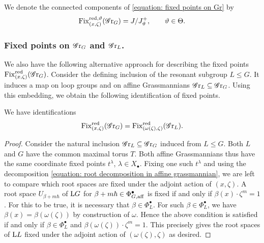 \begin{notation}
We denote the connected components of \eqref{equation: fixed points on Gr} by
\begin{equation*}
    \operatorname{Fix}^{\operatorname{red}, \vartheta}_{(x, \zeta)}(\operatorname{\mathscr{G}r}_G) = J/J^{+}_{\vartheta}, \qquad \vartheta \in \Theta.
\end{equation*}
\end{notation}




\subsubsection{Fixed points on $\operatorname{\mathscr{G}r}_G$ and $\operatorname{\mathscr{G}r}_L$.}\label{section: fixed points on GrG and GrL}
We also have the following alternative approach for describing the fixed points $\operatorname{Fix}^{\operatorname{red}}_{(x, \zeta)}(\operatorname{\mathscr{G}r}_G)$.
%
Consider the defining inclusion of the resonant subgroup $L \leq G$. It induces a map on loop groups and on affine Grassmannians $\operatorname{\mathscr{G}r}_L \subseteq \operatorname{\mathscr{G}r}_G$. Using this embedding, we obtain the following identification of fixed points.

\begin{lemma}\label{lemma: replacing x by the resonant part}
We have identifications
\begin{equation*}
    \operatorname{Fix}^{\operatorname{red}}_{(x, \zeta)}(\operatorname{\mathscr{G}r}_G) = \operatorname{Fix}^{\operatorname{red}}_{(\omega(\zeta), \zeta)}(\operatorname{\mathscr{G}r}_L).
\end{equation*}
\end{lemma}
\begin{proof}
Consider the natural inclusion $\operatorname{\mathscr{G}r}_L \subseteq \operatorname{\mathscr{G}r}_G$ induced from $L \leq G$. Both $L$ and $G$ have the common maximal torus $T$. Both affine Grassmannians thus have the same coordinate fixed points $t^{\lambda}$, $\lambda \in X_{\bullet}$. Fixing one such $t^{\lambda}$ and using the decomposition \eqref{equation: root decomposition in affine grassmannian}, we are left to compare which root spaces are fixed under the adjoint action of $(x, \zeta)$. A root space $U_{\beta + m\hbar}$ of $\mathrm{L} G$ for $\beta + m\hbar \in \Phi^{\bullet}_{G, \mathrm{aff}}$ is fixed if and only if $\beta(x)\cdot \zeta^m=1$. For this to be true, it is necessary that $\beta \in \Phi^{\bullet}_L$. For such $\beta \in \Phi^{\bullet}_L$, we have $\beta(x)=\beta(\omega(\zeta))$ by construction of $\omega$. Hence the above condition is satisfied if and only if $\beta \in \Phi^{\bullet}_L$ and $\beta(\omega(\zeta))\cdot \zeta^m=1$. This precisely gives the root spaces of $\mathrm{L} L$ fixed under the adjoint action of $(\omega(\zeta), \zeta)$ as desired.
\end{proof}

